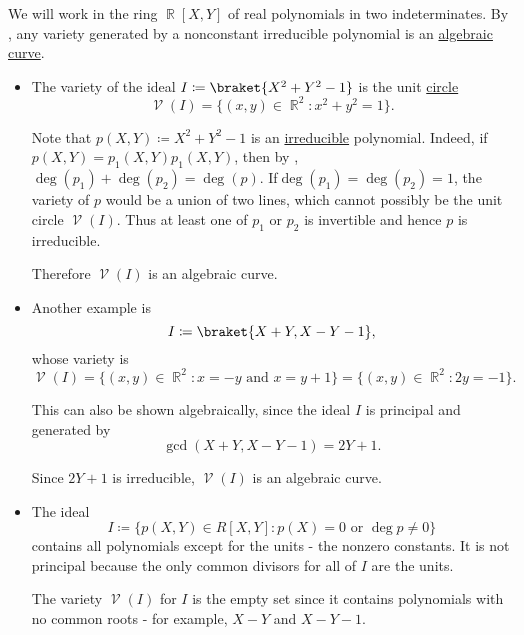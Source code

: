 \begin{example}\label{ex:affine_varieties}
  We will work in the ring \( \BbbR[X, Y] \) of real polynomials in two indeterminates. By , any variety generated by a nonconstant irreducible polynomial is an \hyperref[def:affine_variety/algebraic_curve]{algebraic curve}.

  \begin{itemize}
    \item The variety of the ideal \( I \coloneqq \braket{X^2 + Y^2 - 1} \) is the unit \hyperref[def:quadratic_plane_curve/ellipse]{circle}
          \begin{equation*}
            \mscrV(I) = \{ (x, y) \in \BbbR^2 \colon x^2 + y^2 = 1 \}.
          \end{equation*}

          Note that \( p(X, Y) \coloneqq X^2 + Y^2 - 1 \) is an \hyperref[def:irreducible_ring_element]{irreducible} polynomial. Indeed, if \( p(X, Y) = p_1(X, Y) p_1(X, Y) \), then by , \( \deg(p_1) + \deg(p_2) = \deg(p) \). If\LEM \( \deg(p_1) = \deg(p_2) = 1 \), the variety of \( p \) would be a union of two lines, which cannot possibly be the unit circle \( \mscrV(I) \). Thus at least one of \( p_1 \) or \( p_2 \) is invertible and hence \( p \) is irreducible.

          Therefore \( \mscrV(I) \) is an algebraic curve.

    \item Another example is
          \begin{equation*}
            I \coloneqq \braket{X + Y, X - Y - 1},
          \end{equation*}
          whose variety is
          \begin{equation*}
            \mscrV(I) = \{ (x, y) \in \BbbR^2 \colon x = -y \text{ and } x = y + 1 \} = \{ (x, y) \in \BbbR^2 \colon 2y = -1 \}.
          \end{equation*}

          This can also be shown algebraically, since the ideal \( I \) is principal and generated by
          \begin{equation*}
            \gcd(X + Y, X - Y - 1) = 2Y + 1.
          \end{equation*}

          Since \( 2Y + 1 \) is irreducible, \( \mscrV(I) \) is an algebraic curve.

    \item The ideal
          \begin{equation*}
            I \coloneqq \{ p(X, Y) \in R[X, Y] \colon p(X) = 0 \text{ or } \deg p \neq 0 \}
          \end{equation*}
          contains all polynomials except for the units - the nonzero constants. It is not principal because the only common divisors for all of \( I \) are the units.

          The variety \( \mscrV(I) \) for \( I \) is the empty set since it contains polynomials with no common roots - for example, \( X - Y \) and \( X - Y - 1 \).
  \end{itemize}
\end{example}

